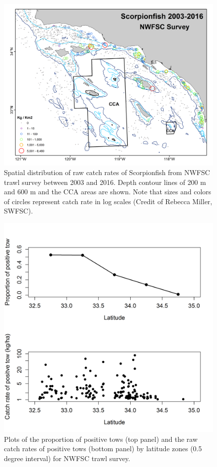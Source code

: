 \documentclass[12pt,]{article}
\begin{document}
\FloatBarrier

\begin{figure}[htbp]
\centering
\includegraphics{Figures/NWFSCtrawl_map.png}
\caption{Spatial distribution of raw catch rates of Scorpionfish from
NWFSC trawl survey between 2003 and 2016. Depth contour lines of 200 m
and 600 m and the CCA areas are shown. Note that sizes and colors of
circles represent catch rate in log scales (Credit of Rebecca Miller,
SWFSC). \label{fig:Fleet8_NWFSCtrawl_map}}
\end{figure}

\begin{figure}[htbp]
\centering
\includegraphics{Figures/NWFSCtrawl_poslat.png}
\caption{Plots of the proportion of positive tows (top panel) and the
raw catch rates of positive tows (bottom panel) by latitude zones (0.5
degree interval) for NWFSC trawl survey.
\label{fig:Fleet8_NWFSCtrawl_poslat}}
\end{figure}
\end{document}
